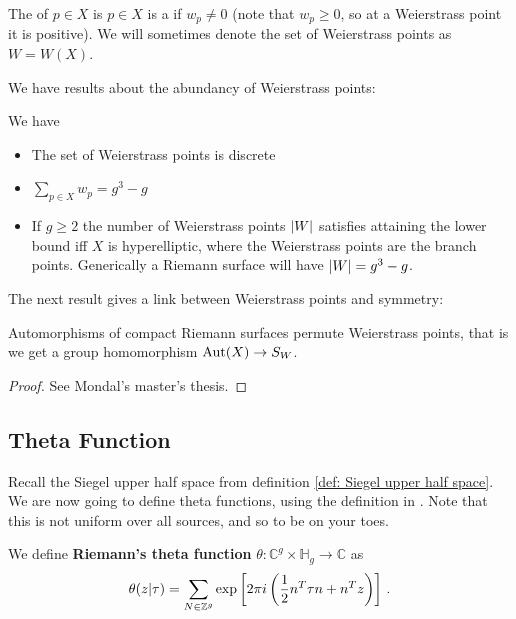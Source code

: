 \documentclass{article}
\begin{document}
\begin{definition}
	The  of $p \in X$ is 
	$p \in X$ is a  if $w_p \neq 0$ (note that $w_p \geq 0$, so at a Weierstrass point it is positive). We will sometimes denote the set of Weierstrass points as $W=W(X)$. 
\end{definition}
We have results about the abundancy of Weierstrass points:
\begin{prop}
	We have 
	\begin{itemize}
		\item The set of Weierstrass points is discrete
		\item $\sum_{p \in X} w_p = g^3-g$
		\item If $g\geq 2$ the number of Weierstrass points $\left\lvert W \right\rvert$ satisfies 
		attaining the lower bound iff $X$ is hyperelliptic, where the Weierstrass points are the branch points. Generically a Riemann surface will have $\left\lvert W \right\rvert=g^3-g$. 
	\end{itemize}
\end{prop}

The next result gives a link between Weierstrass points and symmetry:
\begin{theorem}
	Automorphisms of compact Riemann surfaces permute Weierstrass points, that is we get a group homomorphism $\operatorname{Aut}(X) \to S_{W}$. 
\end{theorem}
\begin{proof}
	See Mondal's master's thesis. 
\end{proof}
\subsection{Theta Function}\label{subsec: theta functions (riemann surfaces)}
Recall the Siegel upper half space from definition \ref{def: Siegel upper half space}. We are now going to define theta functions, using the definition in \cite{Farkas1992}. Note that this is not uniform over all sources, and so to be on your toes. 
\begin{definition}
	We define \textbf{Riemann's theta function} $\theta:\mathbb{C}^g \times \mathbb{H}_g \to \mathbb{C}$ as  
	\[
	\theta(z|\tau) = \sum_{N \in \mathbb{Z}^g} \exp \left[ 2\pi i \left( \frac{1}{2} n^T \tau n + n^Tz \right) \right] \, .
	\]
\end{definition}
\end{document}

